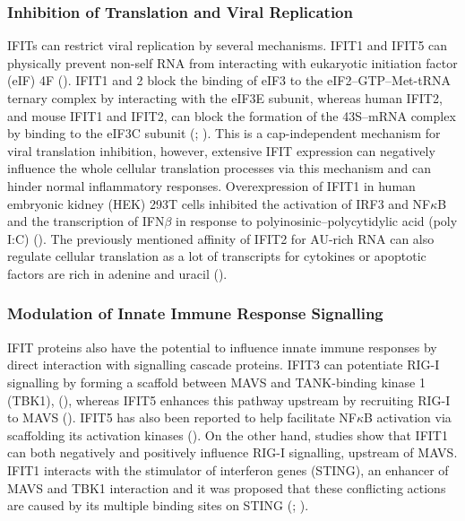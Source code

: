 \subsubsection{Inhibition of Translation and Viral Replication} \label{Inhibition of Translation and Viral Replication}
IFITs can restrict viral replication by several mechanisms. IFIT1 and IFIT5 can physically prevent non-self RNA from interacting with eukaryotic initiation factor (eIF) 4F (\cite{Kumar2014InhibitionMRNAs}). IFIT1 and 2 block the binding of eIF3 to the eIF2–GTP–Met-tRNA ternary complex by interacting with the eIF3E subunit, whereas human IFIT2, and mouse IFIT1 and IFIT2, can block the formation of the 43S–mRNA complex by binding to the eIF3C subunit (\cite{Diamond2014IFIT1:Translation}; \cite{Guo2000CharacterizationVirus}). This is a cap-independent mechanism for viral translation inhibition, however, extensive IFIT expression can negatively influence the whole cellular translation processes via this mechanism and can hinder normal inflammatory responses. Overexpression of IFIT1 in human embryonic kidney (HEK) 293T cells inhibited the activation of IRF3 and NF\(\kappa\)B and the transcription of IFN\(\beta\) in response to polyinosinic–polycytidylic acid (poly I:C) (\cite{Li2009ISG56Response}). The previously mentioned affinity of IFIT2 for AU-rich RNA can also regulate cellular translation as a lot of transcripts for cytokines or apoptotic factors are rich in adenine and uracil (\cite{Palanisamy2012ControlMicroRNAs}). 

\subsubsection{Modulation of Innate Immune Response Signalling} \label{Modulation of Innate Immune Response Signalling}
IFIT proteins also have the potential to influence innate immune responses by direct interaction with signalling cascade proteins. IFIT3 can potentiate RIG-I signalling by forming a scaffold between MAVS and TANK-binding kinase 1 (TBK1), (\cite{Liu2011IFN-InducedTBK1}), whereas IFIT5 enhances this pathway upstream by recruiting RIG-I to MAVS (\cite{Zhang2013IFIT5Pathways}). IFIT5 has also been reported to help facilitate NF\(\kappa\)B activation via scaffolding its activation kinases (\cite{Zhang2013IFIT5Pathways}). On the other hand, studies show that IFIT1 can both negatively and positively influence RIG-I signalling, upstream of MAVS. IFIT1 interacts with the stimulator of interferon genes (STING), an enhancer of MAVS and TBK1 interaction and it was proposed that these conflicting actions are caused by its multiple binding sites on STING (\cite{Li2009ISG56Response}; \cite{Reynaud2015IFIT1Interferon}). 

